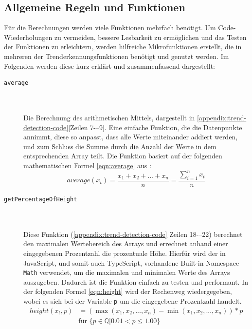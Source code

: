 \subsection{Allgemeine Regeln und Funktionen}\label{2:general_implementations}
Für die Berechnungen werden viele Funktionen mehrfach benötigt. Um Code-Wiederholungen zu vermeiden, bessere Lesbarkeit zu ermöglichen und das Testen der Funktionen zu erleichtern, werden hilfreiche Mikrofunktionen erstellt, die in mehreren der Trenderkennungsfunktionen benötigt und genutzt werden. Im Folgenden werden diese kurz erklärt und zusammenfassend dargestellt:
\begin{description}

\item[\texttt{average}] \hfill \\\\
Die Berechnung des arithmetischen Mittels, dargestellt in \ref{appendix:trend-detection-code}[Zeilen 7-–9]. Eine einfache Funktion, die die Datenpunkte annimmt, diese so anpasst, dass alle Werte miteinander addiert werden, und zum Schluss die Summe durch die Anzahl der Werte in dem entsprechenden Array teilt. Die Funktion basiert auf der folgenden mathematischen Formel \ref{eqn:average} aus \cite{Papula.2017}:
\begin{equation}
\label{eqn:average}
         average(x_t)=\frac{x_1+x_2+...+x_n}{n}=\frac{\sum\limits_{i=1}^nx_t}{n} 
\end{equation}

\item[\texttt{getPercentageOfHeight}] \hfill \\\\
Diese Funktion (\ref{appendix:trend-detection-code} Zeilen 18-–22) berechnet den maximalen Wertebereich des Arrays und errechnet anhand einer eingegebenen Prozentzahl die prozentuale Höhe. Hierfür wird der in JavaScript, und somit auch TypeScript, vorhandene Built-in Namespace \texttt{Math} \cite{MDNcontributors.} verwendet, um die maximalen und minimalen Werte des Arrays auszugeben. Dadurch ist die Funktion einfach zu testen und performant. In der folgenden Formel \ref{eqn:height} wird der Rechenweg wiedergegeben, wobei es sich bei der Variable \texttt{p} um die eingegebene Prozentzahl handelt.\\ 
\begin{equation}
\begin{split}
\label{eqn:height}
 height(x_t,p)&=(\max(x_1, x_2, ..., x_n) - \min(x_1, x_2, ..., x_n)) * p \\
&\text{für } \{p \in \mathbb{Q}| 0.01 < p \le 1.00 \}
\end{split}
\end{equation}



\end{description}
